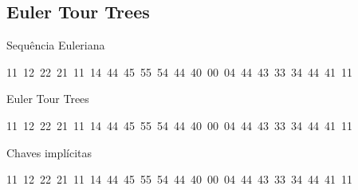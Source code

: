 \documentclass{IFES-beamer}
\newcommand{\red}{\color{red}}
\begin{document}
\subsection{Euler Tour Trees}

\begin{frame}{Sequência Euleriana}
\begin{center}
\begin{figure}


\end{figure}
    {\large 11~12~22~21~11~{\red 14}~44~45~55~54~44~40~00~04~44~43~33~34~44~{\red 41~11}}
\end{center}
\end{frame}

\begin{frame}{Euler Tour Trees}

\begin{figure}[htb]
\centering
\scalebox{.7}{
}
\end{figure}
\begin{center}
{\large 11~12~22~21~11~14~44~45~55~54~44~40~00~04~44~43~33~34~44~41~11}

\end{center}
\end{frame}



\begin{frame}{Chaves implícitas}
\begin{figure}[htb]
\scalebox{.7}{
\centering
}
\end{figure}
\begin{center}
{\large 11~12~22~21~11~14~44~45~55~54~44~40~00~04~44~43~33~34~44~41~11}
\end{center}
\end{frame}
\end{document}
